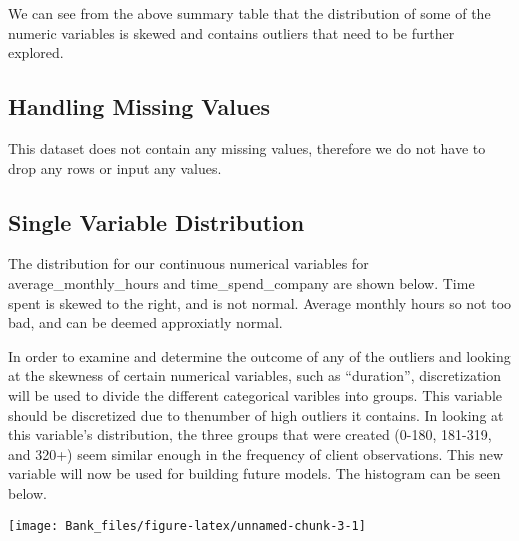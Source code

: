 \documentclass[
]{article}
\newenvironment{Shaded}{\begin{snugshade}}{\end{snugshade}}
\newcommand{\AttributeTok}[1]{\textcolor[rgb]{0.13,0.29,0.53}{#1}}
\newcommand{\CommentTok}[1]{\textcolor[rgb]{0.56,0.35,0.01}{\textit{#1}}}
\newcommand{\FunctionTok}[1]{\textcolor[rgb]{0.13,0.29,0.53}{\textbf{#1}}}
\newcommand{\NormalTok}[1]{#1}
\newcommand{\SpecialCharTok}[1]{\textcolor[rgb]{0.81,0.36,0.00}{\textbf{#1}}}
\newcommand{\StringTok}[1]{\textcolor[rgb]{0.31,0.60,0.02}{#1}}
\begin{document}
We can see from the above summary table that the distribution of some of
the numeric variables is skewed and contains outliers that need to be
further explored.

\subsection{Handling Missing Values}\label{handling-missing-values}

This dataset does not contain any missing values, therefore we do not
have to drop any rows or input any values.

\subsection{Single Variable
Distribution}\label{single-variable-distribution}

The distribution for our continuous numerical variables for
average\_monthly\_hours and time\_spend\_company are shown below. Time
spent is skewed to the right, and is not normal. Average monthly hours
so not too bad, and can be deemed approxiatly normal.

In order to examine and determine the outcome of any of the outliers and
looking at the skewness of certain numerical variables, such as
``duration'', discretization will be used to divide the different
categorical varibles into groups. This variable should be discretized
due to thenumber of high outliers it contains. In looking at this
variable's distribution, the three groups that were created (0-180,
181-319, and 320+) seem similar enough in the frequency of client
observations. This new variable will now be used for building future
models. The histogram can be seen below.

\begin{Shaded}
\end{Shaded}

\begin{center}\texttt{[image: Bank\_files/figure-latex/unnamed-chunk-3-1]} \end{center}
\end{document}
